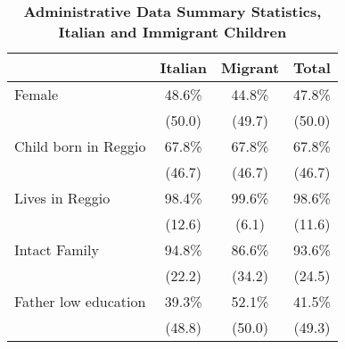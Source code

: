 %
\begin{table}[!ht]
\caption{\textbf{Administrative Data Summary Statistics, Italian and Immigrant Children}}
\label{tab:AdminSum}
\begin{center}
\scriptsize

\begin{tabular}{l*{3}{c}} \hline\hline
             &     \textbf{Italian}  &     \textbf{Migrant}  &       \textbf{Total}\\
\hline
Female       &       48.6\%  &       44.8\%  &       47.8\%\\
             &     (50.0)  &     (49.7)  &     (50.0)\\
Child born in Reggio  &       67.8\%  &       67.8\%  &       67.8\% \\
              &     (46.7)  &     (46.7)  &     (46.7) \\
Lives in Reggio  &       98.4\%  &       99.6\%  &       98.6\%\\
              &     (12.6)  &     (6.1)  &     (11.6)\\
Intact Family  &       94.8\%  &       86.6\%  &       93.6\%\\
              &     (22.2)  &     (34.2)  &     (24.5)\\
Father low education  &       39.3\%  &       52.1\%  &       41.5\%\\
              &     (48.8)  &     (50.0)  &     (49.3)\\

\end{tabular}
\end{center}
\end{table}
